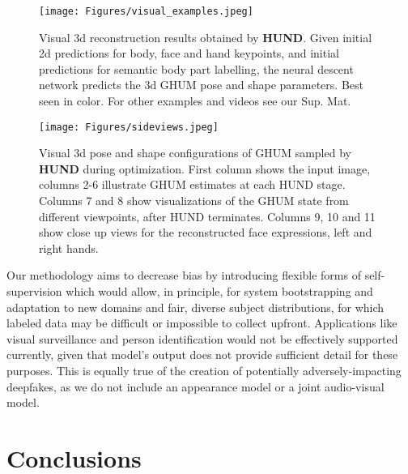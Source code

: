\documentclass[final]{cvpr}
\begin{document}
\begin{figure*}[!htbp]
\begin{center}
    \texttt{[image: Figures/visual\_examples.jpeg]}
\end{center}
\vspace{-4mm}
\caption{\small Visual 3d reconstruction results obtained by {\bf HUND}. Given initial 2d predictions for body, face and hand keypoints, and initial predictions for semantic body part labelling, the neural descent network predicts the 3d GHUM pose and shape parameters. Best seen in color. For other examples and videos see our Sup. Mat. 
}
\label{fig:visuals1}
\end{figure*}

\begin{figure*}[!htbp]
\begin{center}
    \texttt{[image: Figures/sideviews.jpeg]}
\end{center}
\vspace{-4mm}
\caption{\small Visual 3d pose and shape configurations of GHUM sampled by {\bf HUND} during optimization. First column shows the input image, columns 2-6 illustrate GHUM estimates at each HUND stage. Columns 7 and 8 show visualizations of the GHUM state from different viewpoints, after HUND terminates. Columns 9, 10 and 11 show close up views for the reconstructed face expressions, left and right hands.
}
\label{fig:hund-optim-visuals}
\end{figure*}
 Our methodology aims to decrease bias by introducing flexible forms of self-supervision which would allow, in principle, for system bootstrapping and adaptation to new domains and fair, diverse subject distributions, for which labeled data may be difficult or impossible to collect upfront. Applications like visual surveillance and person identification would not be effectively supported currently, given that model's output does not provide sufficient detail for these purposes. This is equally true of the creation of potentially adversely-impacting deepfakes, as we do not include an appearance model or a joint audio-visual model.



\section{Conclusions}
\end{document}

